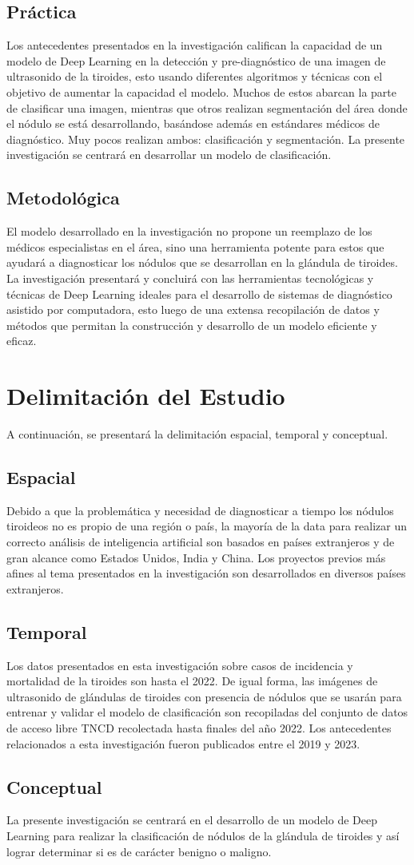 \subsection{Práctica}
Los antecedentes presentados en la investigación califican la capacidad de un modelo de Deep Learning en la detección y pre-diagnóstico de una imagen de ultrasonido de la tiroides, esto usando diferentes algoritmos y técnicas con el objetivo de aumentar la capacidad el modelo. Muchos de estos abarcan la parte de clasificar una imagen, mientras que otros realizan segmentación del área donde el nódulo se está desarrollando, basándose además en estándares médicos de diagnóstico. Muy pocos realizan ambos: clasificación y segmentación. La presente investigación se centrará en desarrollar un modelo de clasificación. 

\subsection{Metodológica}
El modelo desarrollado en la investigación no propone un reemplazo de los médicos especialistas en el área, sino una herramienta potente para estos que ayudará a diagnosticar los nódulos que se desarrollan en la glándula de tiroides. La investigación presentará y concluirá con las herramientas tecnológicas y técnicas de Deep Learning ideales para el desarrollo de sistemas de diagnóstico asistido por computadora, esto luego de una extensa recopilación de datos y métodos que permitan la construcción y desarrollo de un modelo eficiente y eficaz.

\section{Delimitación del Estudio}
A continuación, se presentará la delimitación espacial, temporal y conceptual.

\subsection{Espacial}
Debido a que la problemática y necesidad de diagnosticar a tiempo los nódulos tiroideos no es propio de una región o país, la mayoría de la data para realizar un correcto análisis de inteligencia artificial son basados en países extranjeros y de gran alcance como Estados Unidos, India y China. Los proyectos previos más afines al tema presentados en la investigación son desarrollados en diversos países extranjeros. 

\subsection{Temporal}
Los datos presentados en esta investigación sobre casos de incidencia y mortalidad de la tiroides son hasta el 2022. De igual forma, las imágenes de ultrasonido de glándulas de tiroides con presencia de nódulos que se usarán para entrenar y validar el modelo de clasificación son recopiladas del conjunto de datos de acceso libre TNCD recolectada hasta finales del año 2022. Los antecedentes relacionados a esta investigación fueron publicados entre el 2019 y 2023.

\subsection{Conceptual}
La presente investigación se centrará en el desarrollo de un modelo de Deep Learning para realizar la clasificación de nódulos de la glándula de tiroides y así lograr determinar si es de carácter benigno o maligno. 
